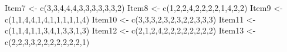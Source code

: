 \documentclass[
  english,
]{book}
\newenvironment{Shaded}{\begin{snugshade}}{\end{snugshade}}
\newcommand{\DecValTok}[1]{\textcolor[rgb]{0.00,0.00,0.81}{#1}}
\newcommand{\FunctionTok}[1]{\textcolor[rgb]{0.00,0.00,0.00}{#1}}
\newcommand{\NormalTok}[1]{#1}
\newcommand{\OtherTok}[1]{\textcolor[rgb]{0.56,0.35,0.01}{#1}}
\begin{document}
\begin{Shaded}
\begin{Highlighting}[]
\NormalTok{Item7 }\OtherTok{\textless{}{-}} \FunctionTok{c}\NormalTok{(}\DecValTok{3}\NormalTok{,}\DecValTok{3}\NormalTok{,}\DecValTok{4}\NormalTok{,}\DecValTok{4}\NormalTok{,}\DecValTok{4}\NormalTok{,}\DecValTok{3}\NormalTok{,}\DecValTok{3}\NormalTok{,}\DecValTok{3}\NormalTok{,}\DecValTok{3}\NormalTok{,}\DecValTok{3}\NormalTok{,}\DecValTok{3}\NormalTok{,}\DecValTok{2}\NormalTok{)}
\NormalTok{Item8 }\OtherTok{\textless{}{-}} \FunctionTok{c}\NormalTok{(}\DecValTok{1}\NormalTok{,}\DecValTok{2}\NormalTok{,}\DecValTok{2}\NormalTok{,}\DecValTok{4}\NormalTok{,}\DecValTok{2}\NormalTok{,}\DecValTok{2}\NormalTok{,}\DecValTok{2}\NormalTok{,}\DecValTok{2}\NormalTok{,}\DecValTok{1}\NormalTok{,}\DecValTok{4}\NormalTok{,}\DecValTok{2}\NormalTok{,}\DecValTok{2}\NormalTok{)}
\NormalTok{Item9 }\OtherTok{\textless{}{-}} \FunctionTok{c}\NormalTok{(}\DecValTok{1}\NormalTok{,}\DecValTok{1}\NormalTok{,}\DecValTok{4}\NormalTok{,}\DecValTok{4}\NormalTok{,}\DecValTok{1}\NormalTok{,}\DecValTok{4}\NormalTok{,}\DecValTok{1}\NormalTok{,}\DecValTok{1}\NormalTok{,}\DecValTok{1}\NormalTok{,}\DecValTok{1}\NormalTok{,}\DecValTok{1}\NormalTok{,}\DecValTok{4}\NormalTok{)}
\NormalTok{Item10 }\OtherTok{\textless{}{-}} \FunctionTok{c}\NormalTok{(}\DecValTok{3}\NormalTok{,}\DecValTok{3}\NormalTok{,}\DecValTok{3}\NormalTok{,}\DecValTok{2}\NormalTok{,}\DecValTok{3}\NormalTok{,}\DecValTok{2}\NormalTok{,}\DecValTok{3}\NormalTok{,}\DecValTok{2}\NormalTok{,}\DecValTok{2}\NormalTok{,}\DecValTok{3}\NormalTok{,}\DecValTok{3}\NormalTok{,}\DecValTok{3}\NormalTok{)}
\NormalTok{Item11 }\OtherTok{\textless{}{-}} \FunctionTok{c}\NormalTok{(}\DecValTok{1}\NormalTok{,}\DecValTok{1}\NormalTok{,}\DecValTok{4}\NormalTok{,}\DecValTok{1}\NormalTok{,}\DecValTok{1}\NormalTok{,}\DecValTok{3}\NormalTok{,}\DecValTok{4}\NormalTok{,}\DecValTok{1}\NormalTok{,}\DecValTok{3}\NormalTok{,}\DecValTok{3}\NormalTok{,}\DecValTok{1}\NormalTok{,}\DecValTok{3}\NormalTok{)}
\NormalTok{Item12 }\OtherTok{\textless{}{-}} \FunctionTok{c}\NormalTok{(}\DecValTok{2}\NormalTok{,}\DecValTok{1}\NormalTok{,}\DecValTok{2}\NormalTok{,}\DecValTok{4}\NormalTok{,}\DecValTok{2}\NormalTok{,}\DecValTok{2}\NormalTok{,}\DecValTok{2}\NormalTok{,}\DecValTok{2}\NormalTok{,}\DecValTok{2}\NormalTok{,}\DecValTok{2}\NormalTok{,}\DecValTok{2}\NormalTok{,}\DecValTok{2}\NormalTok{)}
\NormalTok{Item13 }\OtherTok{\textless{}{-}} \FunctionTok{c}\NormalTok{(}\DecValTok{2}\NormalTok{,}\DecValTok{2}\NormalTok{,}\DecValTok{3}\NormalTok{,}\DecValTok{3}\NormalTok{,}\DecValTok{2}\NormalTok{,}\DecValTok{2}\NormalTok{,}\DecValTok{2}\NormalTok{,}\DecValTok{2}\NormalTok{,}\DecValTok{2}\NormalTok{,}\DecValTok{2}\NormalTok{,}\DecValTok{2}\NormalTok{,}\DecValTok{1}\NormalTok{)}

\end{Highlighting}
\end{Shaded}
\end{document}
